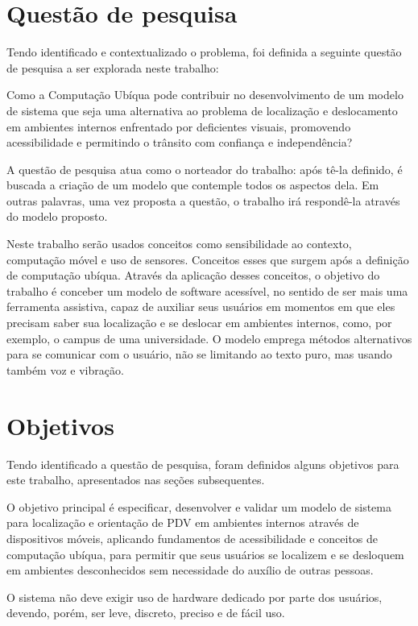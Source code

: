 \documentclass[english,brazilian]{UNISINOSmonografia}
\begin{document}
	\section{Questão de pesquisa}
	Tendo identificado e contextualizado o problema, foi definida a seguinte questão de pesquisa a ser explorada neste trabalho:

	Como a Computação Ubíqua pode contribuir no desenvolvimento de um modelo de sistema que seja uma alternativa ao problema de localização e deslocamento em ambientes internos enfrentado por deficientes visuais, promovendo acessibilidade e permitindo o trânsito com confiança e independência?

	A questão de pesquisa atua como o norteador do trabalho: após tê-la definido, é buscada a criação de um modelo que contemple todos os aspectos dela. Em outras palavras, uma vez proposta a questão, o trabalho irá respondê-la através do modelo proposto.

	Neste trabalho serão usados conceitos como sensibilidade ao contexto, computação móvel e uso de sensores. Conceitos esses que surgem após a definição de computação ubíqua. Através da aplicação desses conceitos, o objetivo do trabalho é conceber um modelo de software acessível, no sentido de ser mais uma ferramenta assistiva, capaz de auxiliar seus usuários em momentos em que eles precisam saber sua localização e se deslocar em ambientes internos, como, por exemplo, o campus de uma universidade. O modelo emprega métodos alternativos para se comunicar com o usuário, não se limitando ao texto puro, mas usando também voz e vibração.

	\section{Objetivos}
	Tendo identificado a questão de pesquisa, foram definidos alguns objetivos para este trabalho, apresentados nas seções subsequentes.
	
		O objetivo principal é especificar, desenvolver e validar um modelo de sistema para localização e orientação de PDV em ambientes internos através de dispositivos móveis, aplicando fundamentos de acessibilidade e conceitos de computação ubíqua, para permitir que seus usuários se localizem e se desloquem em ambientes desconhecidos sem necessidade do auxílio de outras pessoas.

		O sistema não deve exigir uso de hardware dedicado por parte dos usuários, devendo, porém, ser leve, discreto, preciso e de fácil uso. \\
		
\end{document}
